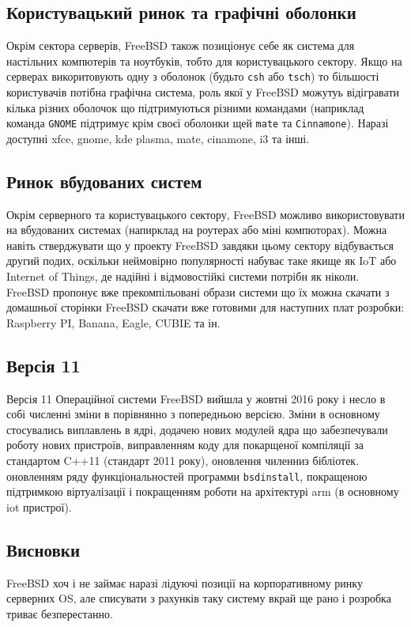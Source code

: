 \begin{itemize}
\subsection{Користувацький ринок та графічні оболонки}
Окрім сектора серверів, FreeBSD також позиціонує себе як система для настільних компютерів та ноутбуків, тобто для користувацького сектору. Якщо на серверах викоритовують одну з оболонок (будьто \texttt{csh} або \texttt{tsch}) то більшості користувачів потібна графічна система, роль якої у FreeBSD можутуь відігравати кілька різних оболочок що підтримуються різними командами (наприклад команда \texttt{GNOME} підтримує крім своєї оболонки щей \texttt{mate} та \texttt{Cinnamone}). Наразі доступні xfce, gnome, kde plasma, mate, cinamone, i3 та інші.

\subsection{Ринок вбудованих систем}
Окрім серверного та користувацького сектору, FreeBSD можливо використовувати на вбудованих системах (напирклад на роутерах або міні компюторах). Можна навіть стверджувати що у проекту FreeBSD завдяки цьому сектору відбувається другий подих, оскільки неймовірно популярності набуває таке якище як IoT або Internet of Things, де надійні і відмовостійкі системи потрібн як ніколи. FreeBSD пропонує вже прекомпільовані образи системи що їх можна скачати з домашньої сторінки FreeBSD скачати вже готовими для наступних плат розробки: Raspberry PI, Banana, Eagle, CUBIE та ін.

\subsection{Версія 11}
Версія 11 Операційної системи FreeBSD вийшла у жовтні 2016 року і несло в собі численні зміни в порівнянно з попередньою версією. Зміни в основному стосувались виплавлень в ядрі, додачею нових модулей ядра що забезпечували роботу нових пристроїв, виправленням коду для покарщеної компіляції за стандартом C++11 (стандарт 2011 року), оновлення чиленниз бібліотек. оновленням ряду функціональностей программи \texttt{bsdinstall}, покращеною підтримкою віртуалізації і покращенням роботи на архітектурі arm (в основному iot пристрої).

\subsection{Висновки}
FreeBSD хоч і не займає наразі лідуючі позиції на корпоративному ринку серверних OS, але списувати з рахунків таку систему вкрай ще рано і розробка триває безперестанно.



\end{itemize}
